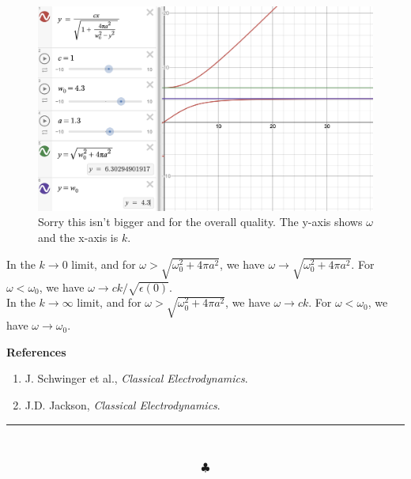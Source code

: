 \documentclass[]{article}
\begin{document}
\begin{enumerate}[a)]
\begin{frame}{}
    \begin{figure}[h]
        \begin{minipage}[b]{0.5\linewidth}
            \centering
            \includegraphics[width=\textwidth]{FreqWave2}
        \end{minipage}
        \hspace{0.5cm}
        \caption{Sorry this isn't bigger and for the overall quality. The y-axis shows $\omega$ and the x-axis is $k$. }
    \end{figure}
\end{frame}

In the $k \to 0$ limit, and for $\omega > \sqrt{ \omega_0^2  + 4\pi a^2 }$,  we have $\omega \to \sqrt{ \omega_0^2  + 4\pi a^2 } $. For $\omega < \omega_0$, we have $\omega \to ck / \sqrt{ \epsilon(0)} $. \\


In the $k \to \infty$ limit, and for $\omega > \sqrt{ \omega_0^2  + 4\pi a^2 }$,  we have $ \omega \to ck$. For $\omega < \omega_0$, we have $\omega \to \omega_0$. 









\end{enumerate}

\newpage

{\bf References}

\begin{enumerate}[(1)]

\item J. Schwinger et al., {\it Classical Electrodynamics}.

\item J.D. Jackson, {\it Classical Electrodynamics}.


\end{enumerate}

\begin{center}
\noindent\rule{15cm}{0.4pt} \\
\end{center}
$$\clubsuit$$
\end{document}
